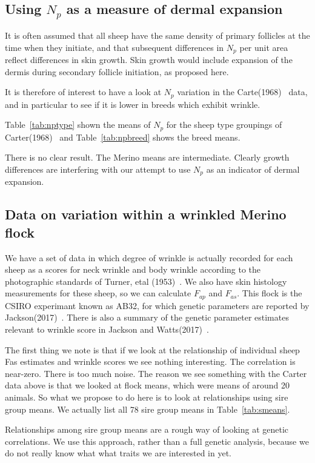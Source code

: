 \documentclass[titlepage]{article}  %
\begin{document}
\subsection{Using $N_{p}$ as a measure of dermal expansion}
It is often assumed that all sheep have the same density of primary follicles at the time when they initiate, and that subsequent differences in $N_{p}$ per unit area reflect differences in skin growth. Skin growth would include expansion of the dermis during secondary follicle initiation, as proposed here. 

It is therefore of interest to have a look at $N_{p}$ variation in the Carte(1968)~\cite{cart:68} data, and in particular to see if it is lower in breeds which exhibit wrinkle. 

Table~\ref{tab:nptype} shown the means of $N_{p}$ for the sheep type groupings of Carter(1968)~\cite{cart:68} and Table~\ref{tab:npbreed} shows the breed means. 


There is no clear result. The Merino means are intermediate. Clearly growth differences are interfering with our attempt to use $N_{p}$ as an indicator of dermal expansion.

\subsection{Data on variation within a wrinkled Merino flock}
We have a set of data in which degree of wrinkle is actually recorded for each sheep as a scores for neck wrinkle and body wrinkle according to the photographic standards of Turner, etal (1953)~\cite{turn:53}. We also have skin histology measurements for these sheep, so we can calculate $F_{ap}$ and $F_{as}$. This flock is the CSIRO experimant known as AB32, for which genetic parameters are reported by Jackson(2017)~\cite{jack:17a}. There is also a summary of the genetic parameter estimates relevant to wrinkle score in Jackson and Watts(2017)~\cite{jack:17b}.

The first thing we note is that if we look at the relationship of individual sheep Fas estimates and wrinkle scores we see nothing interesting. The correlation is near-zero. There is too much noise. The reason we see something with the Carter data above is that we looked at flock means, which were means of around 20 animals. So what we propose to do here is to look at relationships using sire group means.  We actually list all 78 sire group means in Table~\ref{tab:smeans}.

Relationships among sire group means are a rough way of looking at genetic correlations. We use this approach, rather than a full genetic analysis, because we do not really know what what traits we are interested in yet.
\end{document}
